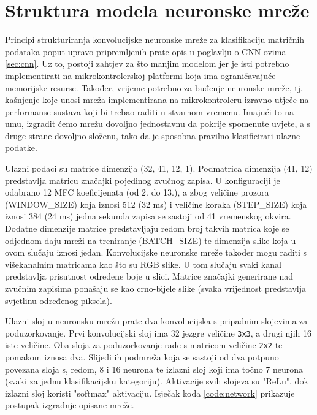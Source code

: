 \section{Struktura modela neuronske mreže}

Principi strukturiranja konvolucijske neuronske mreže za klasifikaciju matričnih podataka
poput upravo pripremljenih prate opis u poglavlju o CNN-ovima \ref{sec:cnn}.
Uz to, postoji zahtjev za što manjim modelom jer je isti potrebno implementirati na 
mikrokontrolerskoj platformi koja ima ograničavajuće memorijske resurse. Također,
vrijeme potrebno za buđenje neuronske mreže, tj. kašnjenje koje unosi mreža
implementirana na mikrokontroleru izravno utječe na performanse sustava 
koji bi trebao raditi u stvarnom vremenu. Imajući to na umu, izgradit ćemo
mrežu dovoljno jednostavnu da pokrije spomenute uvjete, a s druge strane dovoljno
složenu, tako da je sposobna pravilno klasificirati ulazne podatke.

Ulazni podaci su matrice dimenzija (32, 41, 12, 1). Podmatrica dimenzija (41, 12) 
predstavlja matricu značajki pojedinog zvučnog zapisa. U konfiguraciji je odabrano 
12 MFC koeficijenata (od 2. do 13.), a zbog veličine prozora (WINDOW\_SIZE) 
koja iznosi 512 (32 ms) i veličine koraka (STEP\_SIZE) koja iznosi 384 (24 ms)
jedna sekunda zapisa se sastoji od 41 vremenskog okvira. Dodatne dimenzije matrice
predstavljaju redom broj takvih matrica koje se odjednom daju mreži na treniranje 
(BATCH\_SIZE) te dimenzija slike koja u ovom slučaju iznosi jedan. Konvolucijske
neuronske mreže također mogu raditi s višekanalnim matricama kao što su RGB slike. U tom 
slučaju svaki kanal predstavlja prisutnost određene boje u slici. Matrice značajki
generirane nad zvučnim zapisima ponašaju se kao crno-bijele slike (svaka vrijednost
predstavlja svjetlinu određenog piksela).

Ulazni sloj u neuronsku mrežu prate dva konvolucijska s pripadnim slojevima za
poduzorkovanje. Prvi konvolucijski sloj ima 32 jezgre veličine \texttt{3x3},
a drugi njih 16 iste veličine. Oba sloja za poduzorkovanje rade s matricom
veličine \texttt{2x2} te pomakom iznosa dva. Slijedi ih podmreža koja se sastoji 
od dva potpuno povezana sloja 
s, redom, 8 i 16 neurona te izlazni sloj koji ima točno 7 neurona (svaki za jednu
klasifikacijsku kategoriju). Aktivacije svih slojeva su "ReLu", dok izlazni sloj
koristi "softmax" aktivaciju. Isječak koda \ref{code:network} prikazuje postupak
izgradnje opisane mreže.

